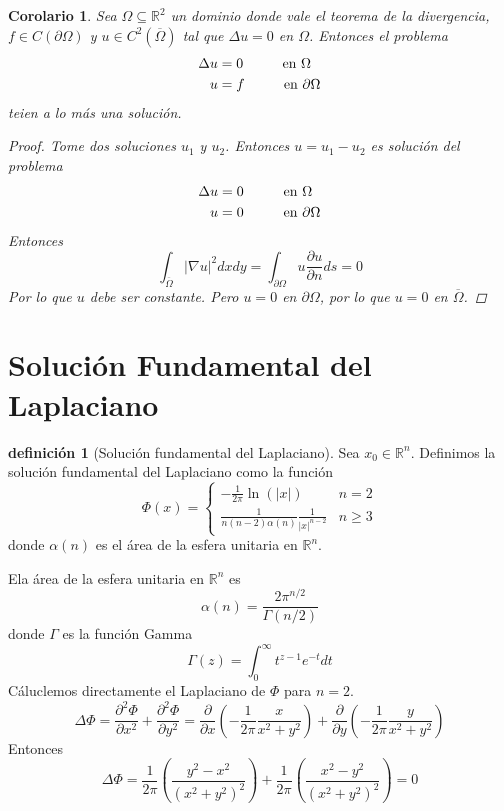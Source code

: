 \documentclass[11pt]{book}
\theoremstyle{plain}
\newtheorem{coro}[proposición]{Corolario}
\theoremstyle{definition}
\newtheorem{defi}[proposición]{definición}
\newcommand{\R}{\mathbb{R}}
\begin{document}
    \begin{coro}
        Sea $\Omega \subseteq \R^{2}$ un dominio donde vale el teorema de la divergencia, $f\in C(\partial \Omega)$ y $u \in C^{2}(\overline{\Omega})$ tal que $\Delta u = 0$ en $\Omega$. Entonces el problema
        \begin{align*}
            \Delta u &= 0 \hspace{10mm} \text{en } \Omega\\
            u &= f \hspace{10mm} \text{en } \partial \Omega
        \end{align*}
        teien a lo más una solución.
        \begin{proof}
            Tome dos soluciones $u_{1}$ y $u_{2}$. Entonces $u = u_{1} - u_{2}$ es solución del problema
            \begin{align*}
                \Delta u &= 0 \hspace{10mm} \text{en } \Omega\\
                u &= 0 \hspace{10mm} \text{en } \partial \Omega
            \end{align*}
            Entonces
            \[
                \int_{\overline{\Omega}} |\nabla u|^{2}dxdy = \int_{\partial \Omega} u \frac{\partial u}{\partial n}ds = 0
            \]
            Por lo que $u$ debe ser constante. Pero $u = 0$ en $\partial \Omega$, por lo que $u = 0$ en $\overline{\Omega}$.
        \end{proof}
    \end{coro}

    \section{Solución Fundamental del Laplaciano}
    \setcounter{equation}{0}
    \begin{defi}[Solución fundamental del Laplaciano]
        Sea $x_{0} \in \R^{n}$. Definimos la solución fundamental del Laplaciano como la función
        \[
            \Phi(x) = \begin{cases}
                -\frac{1}{2\pi}\ln(|x|) & n = 2\\
                \frac{1}{n(n-2)\alpha(n)}\frac{1}{|x|^{n-2}} & n \geq 3
            \end{cases}
        \]
        donde $\alpha(n)$ es el área de la esfera unitaria en $\R^{n}$.
    \end{defi}

    Ela área de la esfera unitaria en $\R^{n}$ es
    \[
        \alpha(n) = \frac{2\pi^{n/2}}{\Gamma(n/2)}
    \]
    donde $\Gamma$ es la función Gamma
    \[
        \Gamma(z) = \int_{0}^{\infty} t^{z-1}e^{-t}dt
    \]
    Cáluclemos directamente el Laplaciano de $\Phi$ para $n = 2$.
    \[
        \Delta \Phi = \frac{\partial^{2} \Phi}{\partial x^{2}} + \frac{\partial^{2} \Phi}{\partial y^{2}} = \frac{\partial}{\partial x}\left(-\frac{1}{2\pi}\frac{x}{x^{2} + y^{2}}\right) + \frac{\partial}{\partial y}\left(-\frac{1}{2\pi}\frac{y}{x^{2} + y^{2}}\right)
    \]
    Entonces
    \[
        \Delta \Phi = \frac{1}{2\pi}\left(\frac{y^{2} - x^{2}}{(x^{2} + y^{2})^{2}}\right) + \frac{1}{2\pi}\left(\frac{x^{2} - y^{2}}{(x^{2} + y^{2})^{2}}\right) = 0
    \]
\end{document}

